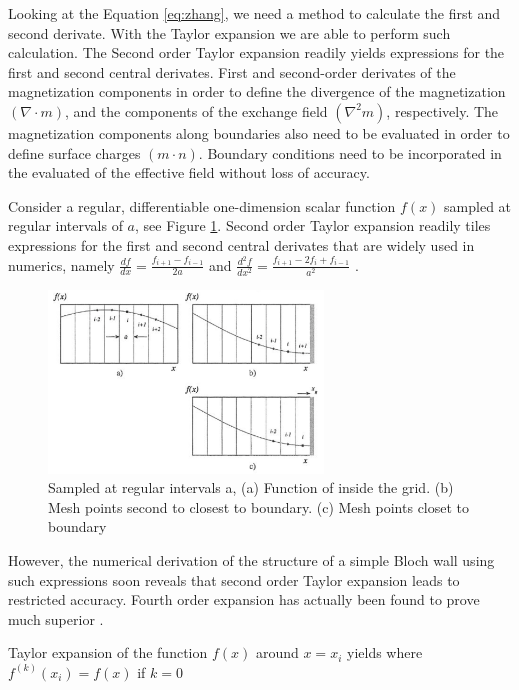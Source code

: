 Looking at the Equation \ref{eq:zhang}, we need a method to calculate the first and second derivate. With the Taylor expansion we are able to perform such calculation. The Second order Taylor expansion readily yields expressions for the first and second central derivates. First and second-order derivates of the magnetization components in order to define the divergence  of the magnetization $(\nabla \cdot m)$, and the components of the exchange field $(\nabla^2m)$, respectively. The magnetization components along boundaries also need to be evaluated in order to define surface charges $(m \cdot n)$. Boundary conditions need to be incorporated in the evaluated of the effective field without loss of accuracy. 

Consider a regular, differentiable one-dimension scalar function $f(x)$ sampled at regular intervals of $a$, see Figure \ref{fig:bound}. Second order Taylor expansion readily tiles expressions for the first and second central derivates that are widely used in numerics, namely $\frac{df}{dx} = \frac{f_{i+1} - f_{i-1}}{2a}$ and $\frac{d^2f}{dx^2} = \frac{f_{i+1} - 2f_i + f_{i-1}}{a^2}$ \cite{methods}.

\begin{figure}[htbp]
	\centering
		\includegraphics[width=0.65\textwidth]{Figures/bound.png}
		\smallskip
	\caption[Sampled at regular intervals, Taylor expansion]{Sampled at regular intervals a, (a) Function of inside the grid. (b) Mesh points second to closest to boundary. (c) Mesh points closet to boundary}
	\label{fig:bound}
\end{figure}

However, the numerical derivation of the structure of a simple Bloch wall using such expressions soon reveals that second order Taylor expansion leads to restricted accuracy. Fourth order expansion has actually been found to prove much superior \cite{methods}.

Taylor expansion of the function $f(x)$ around $x=x_i$ yields where $f^{(k)}(x_i) = f(x)$ if $k=0$

